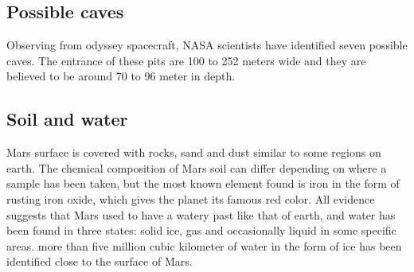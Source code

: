 \subsection{Possible caves}
Observing from odyssey spacecraft, NASA scientists have identified seven possible caves. The entrance of these pits are 100 to 252 meters wide and they are believed to be around 70 to 96 meter in depth\cite{surface}\cite{guide}.

\subsection{Soil and water}
Mars surface is covered with rocks, sand and dust similar to some regions on earth.
The chemical composition of Mars soil can differ depending on where a sample has been taken, but the most known element found is iron in the form of rusting iron oxide, which gives the planet its famous red color.
\newline All evidence suggests that Mars used to have a watery past like that of earth, and water has been found in three states: solid ice, gas and occasionally liquid in some specific areas\cite{liquid}.
more than five million cubic kilometer of water in the form of ice  has been identified close to the surface of Mars\cite{water}.

